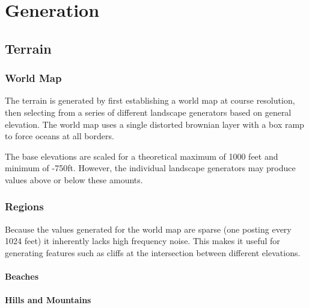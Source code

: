 
\chapter{Generation}

\section {Terrain}

\subsection{World Map}

The terrain is generated by first establishing a world map at course resolution, then selecting from a series of different landscape generators based on general elevation.
The world map uses a single distorted brownian layer with a box ramp to force oceans at all borders.

The base elevations are scaled for a theoretical maximum of 1000 feet and minimum of -750ft.
However, the individual landscape generators may produce values above or below these amounts.

\subsection{Regions}

Because the values generated for the world map are sparse (one posting every 1024 feet) it inherently lacks high frequency noise.
This makes it useful for generating features such as cliffs at the intersection between different elevations.

\subsubsection{Beaches}

\subsubsection{Hills and Mountains}
